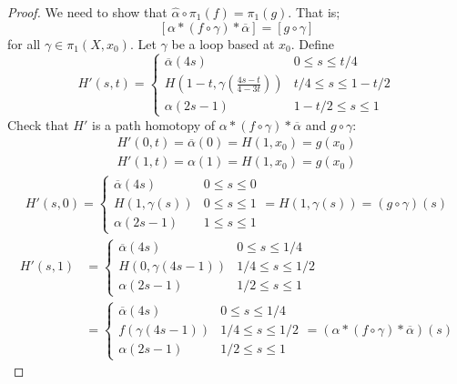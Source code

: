 \begin{proof}
   We need to show that
   \( \hat{\alpha} \circ \pi_1(f) = \pi_1(g) \).
   That is;
   \[
     [\alpha * (f \circ \gamma) * \overline{\alpha}]
     = [g \circ \gamma]
   \]
   for all \( \gamma \in \pi_1(X, x_0) \).
  Let \( \gamma  \) be a loop based at \( x_0 \).
  Define
  \begin{equation}
      H'(s, t) = \begin{cases}
        \overline{\alpha}(4s) & 0 \le s \le t/4 \\
        H(1-t, \gamma(\frac{4s - t}{4 - 3t})) & t/4 \le s \le 1 - t/2 \\
        \alpha(2s-1) & 1-t/2 \le s \le 1
      \end{cases}
  \end{equation}
  Check that \( H' \) is a path homotopy of 
  \( \alpha * (f \circ \gamma) * \overline{\alpha} \)
  and \( g \circ \gamma \):
      \begin{align*}
        H'(0, t) = \overline{\alpha}(0) 
                 = H(1, x_0) 
                 = g(x_0)
      \end{align*}
      \begin{align*}
        H'(1, t) = \alpha(1)
                 = H(1, x_0)
                 = g(x_0)
      \end{align*}
      \begin{align*}
        H'(s, 0) =  \begin{cases}
            \overline{\alpha} (4s) & 0 \le s \le 0 \\
            H(1, \gamma(s)) & 0 \le s \le 1 \\
            \alpha(2s - 1) & 1 \le s \le 1
        \end{cases} 
                 = H(1, \gamma(s))
                 = (g \circ \gamma) (s)
    \end{align*}
      \begin{align*}
        H'(s, 1) &= \begin{cases}
            \overline{\alpha} (4s) & 0 \le s \le 1/4 \\
            H(0, \gamma(4s - 1)) & 1/4 \le s \le 1/2 \\
            \alpha(2s - 1) & 1/2 \le s \le 1
          \end{cases} \\
          &= \begin{cases}
            \overline{\alpha} (4s) & 0 \le s \le 1/4 \\
            f\left(\gamma(4s - 1)\right) & 1/4 \le s \le 1/2 \\
            \alpha(2s - 1) & 1/2 \le s \le 1
          \end{cases}
          = (\alpha * (f \circ \gamma) * \overline{\alpha}) (s)
      \end{align*}
\end{proof}

